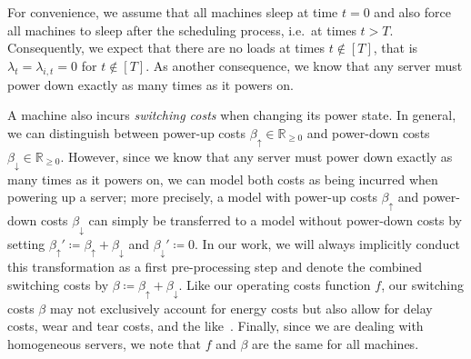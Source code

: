 For convenience, we assume that all machines sleep at time $t=0$ and also force all machines to sleep after the scheduling process, i.e.\ at times $t>T$. Consequently, we expect that there are no loads at times $t\notin[T]$, that is $\lambda_t=\lambda_{i,t}=0$ for $t\notin[T]$. As another consequence, we know that any server must power down exactly as many times as it powers on.

A machine also incurs \emph{switching costs} when changing its power state. In general, we can distinguish between power-up costs $\beta_\uparrow\in\mathbb{R}_{\ge 0}$ and power-down costs $\beta_\downarrow\in\mathbb{R}_{\ge 0}$. However, since we know that any server must power down exactly as many times as it powers on, we can model both costs as being incurred when powering up a server; more precisely, a model with power-up costs $\beta_\uparrow$ and power-down costs $\beta_\downarrow$ can simply be transferred to a model without power-down costs by setting $\beta_\uparrow'\coloneqq\beta_\uparrow+\beta_\downarrow$ and $\beta_\downarrow'\coloneqq0$. In our work, we will always implicitly conduct this transformation as a first pre-processing step and denote the combined switching costs by $\beta\coloneqq\beta_\uparrow+\beta_\downarrow$. Like our operating costs function $f$, our switching costs $\beta$ may not exclusively account for energy costs but also allow for delay costs, wear and tear costs, and the like~\parencite{dyn-right-sizing}. Finally, since we are dealing with homogeneous servers, we note that $f$ and $\beta$ are the same for all machines.

